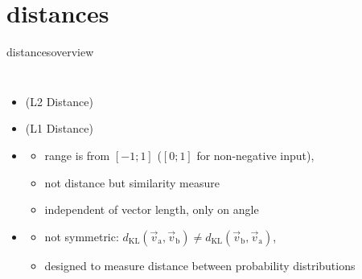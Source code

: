     \section{distances}
        \begin{frame}{distances}{overview }
            \vspace{-5mm}
             \begin{columns}
                    \begin{itemize}
                        \item<1->	\emph{} (L2 Distance)
                        \smallskip
                        \item<2->	\emph{} (L1 Distance)
                        \smallskip
                        \item<3->	\emph{}
                                \begin{itemize}
                                    \item   range is from $[-1;1]$ ($[0;1]$ for non-negative input),
                                    \item   not distance but similarity measure
                                    \item   independent of vector length, only on angle
                                \end{itemize}
                        \smallskip
                        \item<4->	\emph{}
                                \begin{itemize}
                                    \item   not symmetric: $d_\mathrm{KL}(\vec{v}_\mathrm{a},\vec{v}_\mathrm{b})\neq d_\mathrm{KL}(\vec{v}_\mathrm{b},\vec{v}_\mathrm{a})$,
                                    \item   designed to measure distance between probability distributions
                                \end{itemize}
                            \end{itemize}
\end{columns}
\end{frame}
